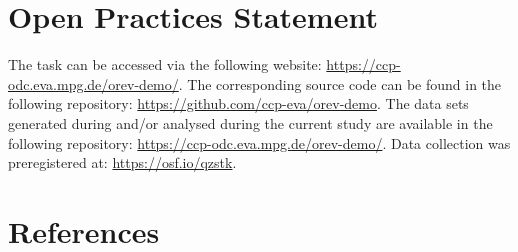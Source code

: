 \documentclass[
  man,floatsintext]{apa6}
\begin{document}
\hypertarget{open-practices-statement}{%
\section{Open Practices Statement}\label{open-practices-statement}}

The task can be accessed via the following website: \url{https://ccp-odc.eva.mpg.de/orev-demo/}. The corresponding source code can be found in the following repository: \url{https://github.com/ccp-eva/orev-demo}. The data sets generated during and/or analysed during the current study are available in the following repository: \url{https://ccp-odc.eva.mpg.de/orev-demo/}. Data collection was preregistered at: \url{https://osf.io/qzstk}.

\newpage

\hypertarget{references}{%
\section{References}\label{references}}
\end{document}
